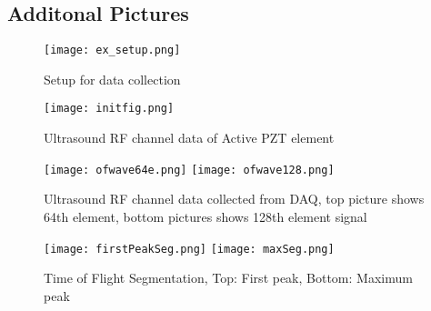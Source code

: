 \documentclass[11pt,letterpaper]{article}
\begin{document}
\subsection{Additonal Pictures}
 	\begin{figure}[!htbp]
 		\texttt{[image: ex\_setup.png]}
 		\caption{Setup for data collection}
 		\label{fig:6}       %
 	\end{figure}
%

 	\begin{figure}[!htbp]
 		\texttt{[image: initfig.png]}
 		\caption{Ultrasound RF channel data of Active PZT element}
 		\label{fig:7}       %
 	\end{figure}
% 

\begin{figure}[!htbp]
	\texttt{[image: ofwave64e.png]}
	\texttt{[image: ofwave128.png]}
	\caption{Ultrasound RF channel data collected from DAQ, top picture shows 64th element, bottom pictures shows 128th element signal}
	\label{fig:8}       %
\end{figure}
% 
\begin{figure}[!htbp]
	\texttt{[image: firstPeakSeg.png]}
	\texttt{[image: maxSeg.png]}
	\caption{Time of Flight Segmentation, Top: First peak, Bottom: Maximum peak}
	\label{fig:9}       %
\end{figure}
% 
\end{document}
